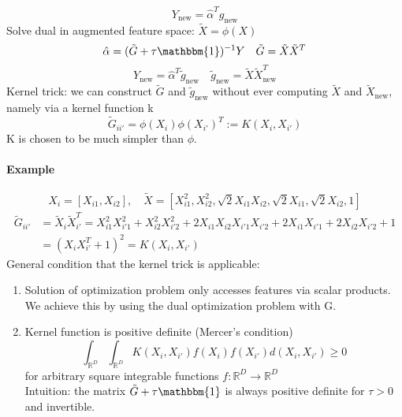 \documentclass[11pt]{article}
\begin{document}
    \begin{equation*}
      \boxed{Y_{\text{new}}=\hat{\alpha}^Tg_{\text{new}}}
    \end{equation*}
    Solve dual in augmented feature space: $\tilde{X}=\phi(X)$
    \begin{equation*}
      \hat{\alpha}=(\tilde{G}+\tau \mathbbm{1})^{-1}Y \quad \tilde{G}=\tilde{X}\tilde{X}^T
    \end{equation*}
    \begin{equation*}
      Y_{\text{new}}=\hat{\alpha}^T\tilde{g}_{\text{new}} \quad \tilde{g}_{\text{new}}=\tilde{X}\tilde{X}_{\text{new}}^T
    \end{equation*}
    Kernel trick: we can construct $\tilde{G}$ and $\tilde{g}_{\text{new}}$ without ever computing
    $\tilde{X}$ and $\tilde{X}_{\text{new}}$, namely via a kernel function k
    \begin{equation*}
      \tilde{G}_{ii'}=\phi(X_i)\phi(X_{i'})^T :=K(X_i,X_{i'})
    \end{equation*}
    K is chosen to be much simpler than $\phi$.
    \noindent \paragraph{Example}
    \begin{equation*}
      X_i= [X_{i1}, X_{i2}], \quad \tilde{X}=[X_{i1}^2, X_{i2}^2, \sqrt{2}X_{i1}X_{i2},
      \sqrt{2}X_{i1}, \sqrt{2}X_{i2}, 1]
    \end{equation*}
    \begin{equation*}
      \begin{align*}
        \tilde{G}_{ii'}&=\tilde{X}_i\tilde{X}_{i'}^T=X_{i1}^2X_{i'1}^2+
        X_{i2}^2X_{i'2}^2+2X_{i1}X_{i2}X_{i'1}X_{i'2}+2X_{i1}X_{i'1}
        +2X_{i2}X_{i'2}+1 \\
        &=(X_iX_{i'}^T+1)^2=K(X_i, X_{i'})
      \end{align*}
    \end{equation*}
    General condition that the kernel trick is applicable:
    \begin{enumerate}
      \item Solution of optimization problem only accesses features via scalar products.
      We achieve this by using the dual optimization problem with G.
      \item Kernel function is positive definite (Mercer's condition)
      \begin{equation*}
        \int_{\mathbb{R}^D}\int_{\mathbb{R}^D}K(X_i, X_{i'})f(X_i)f(X_{i'})d(X_i, X_{i'}) \geq 0
      \end{equation*}
      for arbitrary square integrable functions $f: \mathbb{R}^D \to \mathbb{R}^D$ \\
      Intuition: the matrix $\tilde{G}+\tau \mathbbm{1}$ is always positive definite for $\tau >0$ and invertible.
    \end{enumerate}
\end{document}
